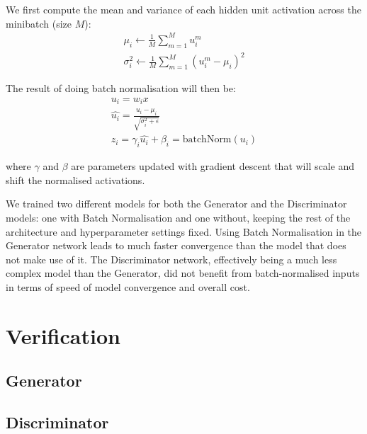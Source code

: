 We first compute the mean and variance of each hidden unit activation across the minibatch (size $M$):
\begin{gather*}
\mu_i \leftarrow \frac{1}{M} \sum_{m=1}^{M}u_i^m \\
\sigma_i^2 \leftarrow \frac{1}{M} \sum_{m=1}^{M}(u_i^m - \mu_i)^2
\end{gather*}

The result of doing batch normalisation will then be:
\begin{gather*}
u_i = w_ix \\
\hat{u_i} = \frac{u_i-\mu_i}{\sqrt{\sigma_i^2 + \epsilon}} \\
z_i = \gamma_i\hat{u_i}+\beta_i = \text{batchNorm}({u_i})
\end{gather*}

where $\gamma$ and $\beta$ are parameters updated with gradient descent that will scale and shift the normalised activations.

We trained two different models for both the Generator and the Discriminator models: one with Batch Normalisation and one without, keeping the rest of the architecture and hyperparameter settings fixed.
Using Batch Normalisation in the Generator network leads to much faster convergence than the model that does not make use of it.
The Discriminator network, effectively being a much less complex model than the Generator, did not benefit from batch-normalised inputs in terms of speed of model convergence and overall cost.


\section{Verification}
\subsection{Generator}
\subsection{Discriminator}